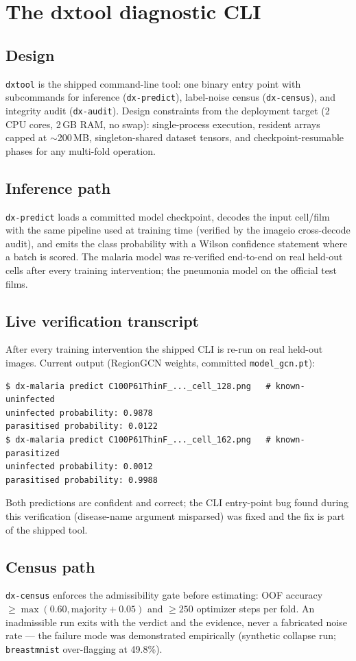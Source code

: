 
\section{The dxtool diagnostic CLI}
\subsection{Design}
\texttt{dxtool} is the shipped command-line tool: one binary entry point
with subcommands for inference (\texttt{dx-predict}), label-noise census
(\texttt{dx-census}), and integrity audit (\texttt{dx-audit}). Design
constraints from the deployment target (2 CPU cores, 2\,GB RAM, no swap):
single-process execution, resident arrays capped at $\sim$200\,MB,
singleton-shared dataset tensors, and checkpoint-resumable phases for any
multi-fold operation.
\subsection{Inference path}
\texttt{dx-predict} loads a committed model checkpoint, decodes the input
cell/film with the same pipeline used at training time (verified by the
imageio cross-decode audit), and emits the class probability with a Wilson
confidence statement where a batch is scored. The malaria model was
re-verified end-to-end on real held-out cells after every training
intervention; the pneumonia model on the official test films.
\subsection{Live verification transcript}
After every training intervention the shipped CLI is re-run on real
held-out images. Current output (RegionGCN weights, committed
\texttt{model\_gcn.pt}):
\begin{verbatim}
$ dx-malaria predict C100P61ThinF_..._cell_128.png   # known-uninfected
uninfected probability: 0.9878
parasitised probability: 0.0122
$ dx-malaria predict C100P61ThinF_..._cell_162.png   # known-parasitized
uninfected probability: 0.0012
parasitised probability: 0.9988
\end{verbatim}
Both predictions are confident and correct; the CLI entry-point bug found
during this verification (disease-name argument misparsed) was fixed and
the fix is part of the shipped tool.
\subsection{Census path}
\texttt{dx-census} enforces the admissibility gate before estimating: OOF
accuracy $\ge \max(0.60, \text{majority}+0.05)$ and $\ge 250$ optimizer
steps per fold. An inadmissible run exits with the verdict and the
evidence, never a fabricated noise rate --- the failure mode was
demonstrated empirically (synthetic collapse run; \texttt{breastmnist}
over-flagging at 49.8\%).
